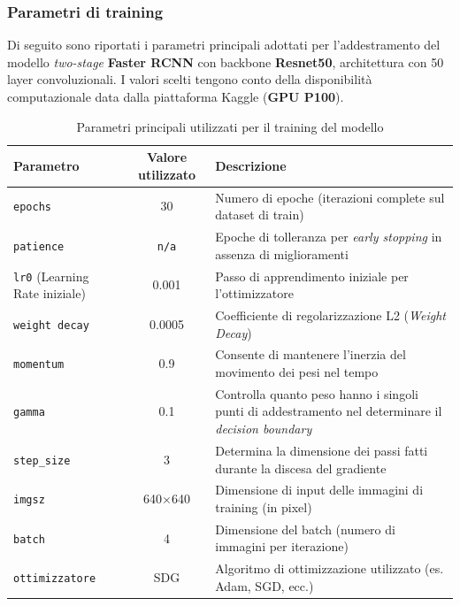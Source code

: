 \documentclass[12pt]{article}
\begin{document}
\subsubsection{Parametri di training}
Di seguito sono riportati i parametri principali adottati per l’addestramento del modello \textit{two-stage} \textbf{Faster RCNN} con backbone \textbf{Resnet50}, architettura con 50 layer convoluzionali. I valori scelti tengono conto della disponibilità computazionale data dalla piattaforma Kaggle (\textbf{GPU P100}).
\begin{table}[H]
\centering
\begin{tabular}{|l|c|p{5.2cm}|}
\hline
\textbf{Parametro} & \textbf{Valore utilizzato} & \textbf{Descrizione} \\
\hline
\texttt{epochs} & 30 & Numero di epoche (iterazioni complete sul dataset di train) \\
\hline
\texttt{patience} & \texttt{n/a} & Epoche di tolleranza per \textit{early stopping} in assenza di miglioramenti \\
\hline
\texttt{lr0} (Learning Rate iniziale) & 0.001 & Passo di apprendimento iniziale per l’ottimizzatore \\
\hline
\texttt{weight decay} & 0.0005 & Coefficiente di regolarizzazione L2 (\textit{Weight Decay}) \\
\hline
\texttt{momentum} & 0.9 & Consente di mantenere l'inerzia del movimento dei pesi
nel tempo \\
\hline
\texttt{gamma} & 0.1 & Controlla quanto peso hanno i singoli punti di addestramento nel determinare il \textit{decision boundary} \\
\hline
\texttt{step\_size} & 3 & Determina la dimensione dei passi fatti durante la discesa del gradiente \\
\hline
\texttt{imgsz} & 640$\times$640 & Dimensione di input delle immagini di training (in pixel) \\
\hline
\texttt{batch} & 4 & Dimensione del batch (numero di immagini per iterazione) \\
\hline
\texttt{ottimizzatore} & SDG & Algoritmo di ottimizzazione utilizzato (es. Adam, SGD, ecc.) \\
\hline
\end{tabular}
\caption{Parametri principali utilizzati per il training del modello}
\label{tab:parametri-training-faster-rcnn}
\end{table}
\end{document}
